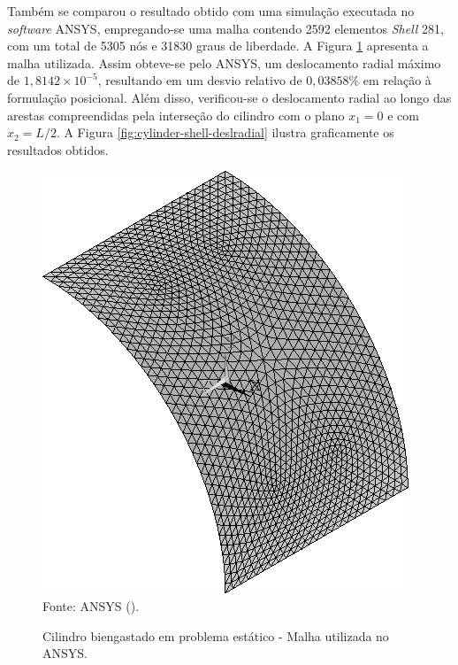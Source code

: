 Também se comparou o resultado obtido com uma simulação executada no \textit{software} ANSYS, empregando-se uma malha contendo 2592 elementos \textit{Shell} 281, com um total de 5305 nós e 31830 graus de liberdade. A Figura \ref{fig:clampedCylinderANSYS} apresenta a malha utilizada. Assim obteve-se pelo ANSYS, um deslocamento radial máximo de $1,8142\times10^{-5}$, resultando em um desvio relativo de $0,03858\%$ em relação à formulação posicional. Além disso, verificou-se o deslocamento radial ao longo das arestas compreendidas pela interseção do cilindro com o plano $x_1=0$ e com $x_2=L/2$. A Figura \ref{fig:cylinder-shell-deslradial} ilustra graficamente os resultados obtidos.

\begin{figure}[h!]
    \centering
    \caption{Cilindro biengastado em problema estático - Malha utilizada no ANSYS.}
    \includegraphics[width=0.35\linewidth]{Figuras/cylinder-shell/ANSYS.png}
    \\Fonte: ANSYS (\the\year).
    \label{fig:clampedCylinderANSYS}
\end{figure}

